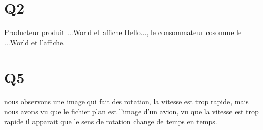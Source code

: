 \documentclass[12pt]{article}
\begin{document}
\section{Q2}
Producteur produit ...World et affiche Hello..., le consommateur cosomme le ...World et l'affiche.


\section{Q5}
nous observons une image qui fait des rotation, la vitesse est trop rapide, mais nous avons vu que le fichier plan est l'image d'un avion,
vu que la vitesse est trop rapide il apparait que le sens de rotation change de temps en temps.
\end{document}
